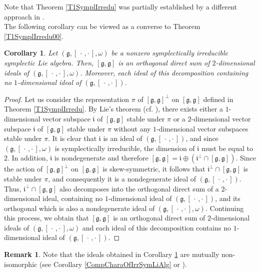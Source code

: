 \documentclass[final,1p,times,nopreprintline]{elsarticle}
\newtheorem{corollary}{Corollary}[section]
\theoremstyle{definition}
\newtheorem{remark}{Remark}[section]
\numberwithin{equation}{section}
\newcommand{\w}{\omega}
\newcommand{\g}{\mathfrak{g}}
\numberwithin{equation}{section}
\newcommand{\ii}{\mathfrak{i}}
\newcommand{\cro}{[\,\cdot\,,\cdot\,]}
\begin{document}
Note that Theorem \ref{T1SymplIrredu} was partially established by a different approach in \cite[pp. 777–778]{DM2}.\\

The following corollary can be viewed as a converse to Theorem \ref{T1SymplIrredu00}.

\begin{corollary}\label{CompCharaOfIrrSymLiAlg0}
Let $(\g,[\,\cdot\,,\cdot\,],\w)$ be a nonzero symplectically irreducible symplectic Lie algebra. Then, $[\g,\g]$ is an orthogonal direct sum of $2$-dimensional ideals of $(\g,\cro,\w)$. Moreover, each ideal of this decomposition containing no $1$-dimensional ideal of $(\g,\cro)$.
\end{corollary}

\begin{proof}
	Let us consider the representation $\pi$ of $[\g,\g]^\perp$ on $[\g,\g]$ defined in Theorem \ref{T1SymplIrredu}. By Lie's theorem (cf. \cite[p. 46]{Bour}), there exists either a $1$-dimensional vector subspace $\ii$ of $[\g,\g]$ stable under $\pi$ or a $2$-dimensional vector subspace $\ii$ of $[\g,\g]$ stable under $\pi$ without any $1$-dimensional vector subspaces stable under $\pi$. It is clear that $\ii$ is an ideal of $(\g,\cro)$, and since $(\g,\cro,\w)$ is symplectically irreducible, the dimension of $\ii$ must be equal to $2$. In addition, $\ii$ is nondegenerate and therefore $[\g,\g]= \ii\oplus(\ii^\perp\cap[\g,\g])$. Since the action of $[\g,\g]^\perp$ on $[\g,\g]$ is skew-symmetric, it follows that $\ii^\perp\cap [\g,\g]$ is stable under $\pi$, and consequently it is a nondegenerate ideal of $(\g,\cro)$. Thus, $\ii^\perp\cap [\g,\g]$ also decomposes into the orthogonal direct sum of a $2$-dimensional ideal, containing no $1$-dimensional ideal of $(\g,\cro)$, and its orthogonal which is also a nondegenerate ideal of $(\g,\cro,\w)$. Continuing this process, we obtain that  $[\g,\g]$ is an orthogonal direct sum of $2$-dimensional ideals of $(\g,\cro,\w)$ and each ideal of this decomposition contains no $1$-dimensional ideal of $(\g,\cro)$.
\end{proof}

\begin{remark}
Note that the ideals obtained in Corollary \ref{CompCharaOfIrrSymLiAlg0} are mutually non-isomorphic (see  Corollary \ref{CompCharaOfIrrSymLiAlg} or \cite[p. 39]{Bau}).
\end{remark}
\end{document}
